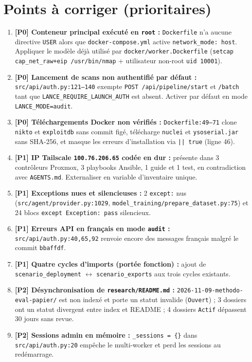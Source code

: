 \documentclass[11pt,a4paper]{article}
\begin{document}
\section{Points à corriger (prioritaires)}
\begin{enumerate}
  \item \textbf{[P0] Conteneur principal exécuté en \texttt{root} :} \texttt{Dockerfile} n'a aucune directive \texttt{USER} alors que \texttt{docker-compose.yml} active \texttt{network\_mode: host}. Appliquer le modèle déjà utilisé par \texttt{docker/worker.Dockerfile} (\texttt{setcap cap\_net\_raw+eip /usr/bin/nmap} + utilisateur non-root \texttt{uid 10001}).
  \item \textbf{[P0] Lancement de scans non authentifié par défaut :} \texttt{src/api/auth.py:121--140} exempte \texttt{POST /api/pipeline/start} et \texttt{/batch} tant que \texttt{LANCE\_REQUIRE\_LAUNCH\_AUTH} est absent. Activer par défaut en mode \texttt{LANCE\_MODE=audit}.
  \item \textbf{[P0] Téléchargements Docker non vérifiés :} \texttt{Dockerfile:49--71} clone \texttt{nikto} et \texttt{exploitdb} sans commit figé, télécharge \texttt{nuclei} et \texttt{ysoserial.jar} sans SHA-256, et masque les erreurs d'installation via \texttt{|| true} (ligne 46).
  \item \textbf{[P1] IP Tailscale \texttt{100.76.206.65} codée en dur :} présente dans 3 contrôleurs Proxmox, 3 playbooks Ansible, 1 guide et 1 test, en contradiction avec \texttt{AGENTS.md}. Externaliser en variable d'inventaire unique.
  \item \textbf{[P1] Exceptions nues et silencieuses :} 2 \texttt{except:} nus (\texttt{src/agent/provider.py:1029}, \texttt{model\_training/prepare\_dataset.py:75}) et 24 blocs \texttt{except Exception: pass} silencieux.
  \item \textbf{[P1] Erreurs API en français en mode \texttt{audit} :} \texttt{src/api/auth.py:40,65,92} renvoie encore des messages français malgré le commit \texttt{bbaffdf}.
  \item \textbf{[P1] Quatre cycles d'imports (portée fonction) :} ajout de \texttt{scenario\_deployment} $\leftrightarrow$ \texttt{scenario\_exports} aux trois cycles existants.
  \item \textbf{[P2] Désynchronisation de \texttt{research/README.md} :} \texttt{2026-11-09-methodo-eval-papier/} est non indexé et porte un statut invalide (\texttt{Ouvert}) ; 3 dossiers ont un statut divergent entre index et README ; 4 dossiers \texttt{Actif} dépassent 30 jours sans revue.
  \item \textbf{[P2] Sessions admin en mémoire :} \texttt{\_sessions = \{\}} dans \texttt{src/api/auth.py:20} empêche le multi-worker et perd les sessions au redémarrage.
\end{enumerate}
\end{document}
